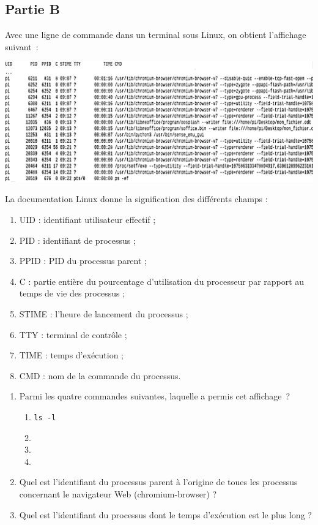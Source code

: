 \documentclass[a4paper,12pt,french]{book}
\begin{document}
    \subsection*{Partie B}
    Avec une ligne de commande dans un terminal sous Linux, on obtient l'affichage suivant :
    \begin{center}
        \includegraphics[width=\linewidth]{img/ps}
    \end{center}

    La documentation Linux donne la signification des différents champs :
    \begin{enumerate}[--]
        \item 	UID : identifiant utilisateur effectif ;
        \item	PID : identifiant de processus ;
        \item	PPID : PID du processus parent ;
        \item	C : partie entière du pourcentage d'utilisation du processeur par rapport au temps de vie des processus ;
        \item	STIME : l'heure de lancement du processus ;
        \item	TTY : terminal de contrôle ;
        \item	TIME : temps d'exécution ;
        \item	CMD :  nom de la commande du processus.
    \end{enumerate}
    \begin{enumerate}[\bfseries 1.]
        \item  Parmi les quatre commandes suivantes, laquelle a permis cet affichage ?
                \begin{multicols}{2}
                    \begin{enumerate}[\bfseries a.]
                        \item \texttt{ls -l}
                        \item {}
                        \columnbreak
                        \item {}
                        \item {}
                    \end{enumerate}
                \end{multicols}
  	     \item Quel est l'identifiant du processus parent à l'origine de toues les processus concernant le navigateur Web (chromium-browser) ?
         \item Quel est l'identifiant du processus dont le temps d'exécution est le plus long ?
    \end{enumerate}
\end{document}
